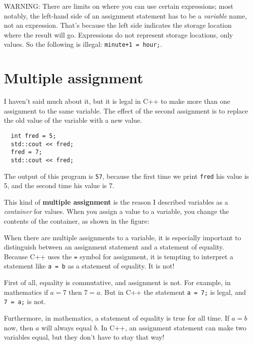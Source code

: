 WARNING: There are limits on where you can use certain
expressions; most notably, the left-hand side of an assignment
statement has to be a {\em variable} name, not an expression.
That's because the left side indicates the storage location
where the result will go.  Expressions
do not represent storage locations, only values.  So the
following is illegal:  {\tt minute+1 = hour;}.

\section{Multiple assignment}

I haven't said much about it, but it is legal in C++ to
make more than one assignment to the same variable.  The
effect of the second assignment is to replace the old value
of the variable with a new value.

\begin{lstlisting}
  int fred = 5;
  std::cout << fred;
  fred = 7;
  std::cout << fred;
\end{lstlisting}
%
The output of this program is {\tt 57}, because the first
time we print {\tt fred} his value is 5, and the second time
his value is 7.

This kind of {\bf multiple assignment} is the reason I
described variables as a {\em container} for values.  When
you assign a value to a variable, you change the contents of
the container, as shown in the figure:

\vspace{0.1in}
\centerline{}
\vspace{0.1in}

When there are multiple assignments to a variable, it is especially
important to distinguish between an assignment statement and a
statement of equality.  Because C++ uses the {\tt =} symbol for
assignment, it is tempting to interpret a statement like {\tt a = b}
as a statement of equality.  It is not!

First of all, equality is commutative, and assignment is not.
For example, in mathematics if $a = 7$ then $7 = a$.  But in
C++ the statement {\tt a = 7;} is legal, and {\tt 7 = a;}
is not.

Furthermore, in mathematics, a statement of equality is true
for all time.  If $a = b$ now, then $a$ will always equal $b$.
In C++, an assignment statement can make two variables equal,
but they don't have to stay that way!

